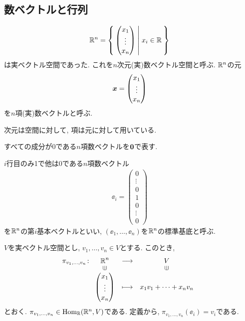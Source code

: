 \subsection{数ベクトルと行列}
\begin{align*}
  \mathbb{R}^n=
  \Set{\begin{pmatrix}x_1\\\vdots\\x_n\end{pmatrix}|x_i\in \mathbb{R}}
\end{align*}
は実ベクトル空間であった.
これを$n$次元(実)数ベクトル空間と呼ぶ.
$\mathbb{R}^n$の元
\begin{align*}
  \boldsymbol{x}=\begin{pmatrix}x_1\\\vdots\\x_n\end{pmatrix}
\end{align*}
を$n$項(実)数ベクトルと呼ぶ.
\begin{remark}
  次元は空間に対して, 項は元に対して用いている.
\end{remark}

すべての成分が0である$n$項数ベクトルを$\boldsymbol{0}$で表す.
\begin{definition}
  $i$行目のみ1で他は0である$n$項数ベクトル
  \begin{align*}
    \ee_i=\begin{pmatrix}0\\\vdots\\0\\1\\0\\\vdots\\0\end{pmatrix}
  \end{align*}
  を$\mathbb{R}^n$の第$i$基本ベクトルといい,
  $(\ee_1,\ldots,\ee_n)$を$\mathbb{R}^n$の標準基底と呼ぶ.
\end{definition}

$V$を実ベクトル空間とし,
$v_1,\ldots,v_n\in V$とする.
このとき,
\begin{align*}
  \pi_{v_1,\ldots,v_n}\colon
  \Shazo{\RR^n}{V}
        {\begin{pmatrix}x_1\\\vdots\\x_n\end{pmatrix}}{x_1v_1+\cdots+x_nv_n}
\end{align*}
とおく.
$\pi_{v_1,\ldots,v_n}\in \operatorname{Hom}_{\mathbb{R}}(\mathbb{R}^n,V)$である.
定義から,
$\pi_{v_1,\ldots,v_n}(\ee_i)=v_i$である.

